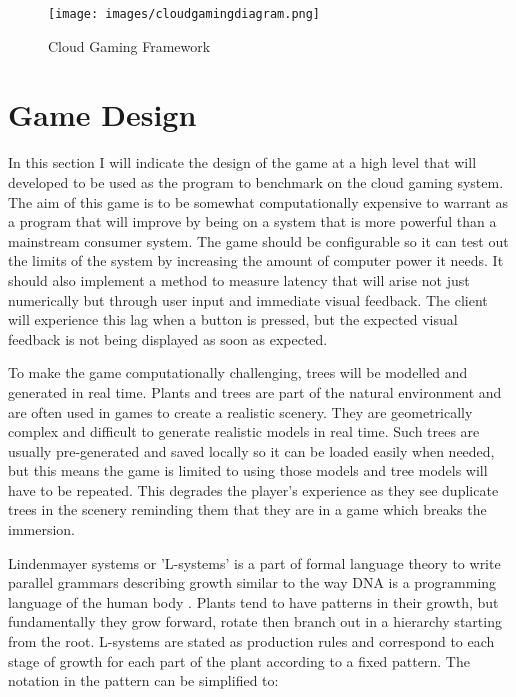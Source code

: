 \clearpage
\begin{figure}[h!]
 \centering
 \texttt{[image: images/cloudgamingdiagram.png]}
 \caption{Cloud Gaming Framework}
 \label{fig:cloudframework}
\end{figure}

\section{Game Design}
In this section I will indicate the design of the game at a high level that will developed to be used as the program to benchmark on the cloud gaming system. The aim of this game is to be somewhat computationally expensive to warrant as a program that will improve by being on a system that is more powerful than a mainstream consumer system. The game should be configurable so it can test out the limits of the system by increasing the amount of computer power it needs. It should also implement a method to measure latency that will arise not just numerically but through user input and immediate visual feedback. The client will experience this lag when a button is pressed, but the expected visual feedback is not being displayed as soon as expected.
\newline
\par
To make the game computationally challenging, trees will be modelled and generated in real time. Plants and trees are part of the natural environment and are often used in games to create a realistic scenery. They are geometrically complex and difficult to generate realistic models in real time. Such trees are usually pre-generated and saved locally so it can be loaded easily when needed, but this means the game is limited to using those models and tree models will have to be repeated. This degrades the player's experience as they see duplicate trees in the scenery reminding them that they are in a game which breaks the immersion.
\newline
\par
Lindenmayer systems or 'L-systems' is a part of formal language theory to write parallel grammars describing growth similar to the way DNA is a programming language of the human body \cite{prusinkiewicz2012algorithmic}. Plants tend to have patterns in their growth, but fundamentally they grow forward, rotate then branch out in a hierarchy starting from the root. L-systems are stated as production rules and correspond to each stage of growth for each part of the plant according to a fixed pattern. The notation in the pattern can be simplified to:
